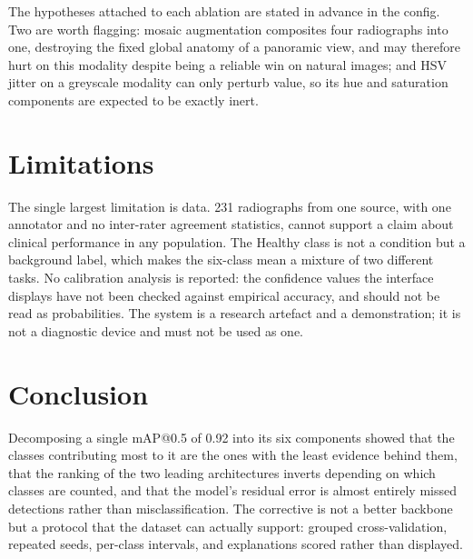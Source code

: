\documentclass[10pt,twocolumn]{article}
\newcommand{\clsname}[1]{\textsf{#1}}
\begin{document}
The hypotheses attached to each ablation are stated in advance in the config.
Two are worth flagging: mosaic augmentation composites four radiographs into
one, destroying the fixed global anatomy of a panoramic view, and may therefore
hurt on this modality despite being a reliable win on natural images; and HSV
jitter on a greyscale modality can only perturb value, so its hue and saturation
components are expected to be exactly inert.

\section{Limitations}

The single largest limitation is data. 231 radiographs from one source, with one
annotator and no inter-rater agreement statistics, cannot support a claim about
clinical performance in any population. The \clsname{Healthy} class is not a
condition but a background label, which makes the six-class mean a mixture of
two different tasks. No calibration analysis is reported: the confidence values
the interface displays have not been checked against empirical accuracy, and
should not be read as probabilities. The system is a research artefact and a
demonstration; it is not a diagnostic device and must not be used as one.

\section{Conclusion}

Decomposing a single mAP@0.5 of 0.92 into its six components showed that the
classes contributing most to it are the ones with the least evidence behind
them, that the ranking of the two leading architectures inverts depending on
which classes are counted, and that the model's residual error is almost
entirely missed detections rather than misclassification. The corrective is not
a better backbone but a protocol that the dataset can actually support: grouped
cross-validation, repeated seeds, per-class intervals, and explanations scored
rather than displayed.

\small


\end{document}
